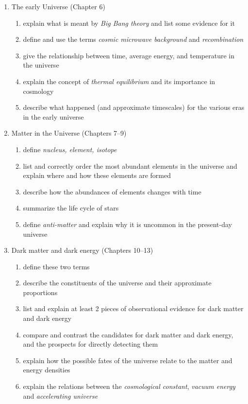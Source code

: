 \documentclass[11pt]{article}
\begin{document}
\begin{enumerate}
\item The early Universe (Chapter 6)
\begin{enumerate}
\item  explain what is meant by {\em Big Bang theory} and list some evidence for it 
\item define and use the terms {\em cosmic microwave background} and {\em recombination}
\item give the relationship between time, average energy, and temperature in the universe 
\item explain the concept of {\em thermal equilibrium} and its importance in cosmology
\item describe what happened (and approximate timescales) for the various eras in the early universe 
\end{enumerate}

\clearpage

\item Matter in the Universe (Chapters 7--9)
\begin{enumerate}
\item define {\em nucleus, element, isotope}
\item list and correctly order the most abundant elements in the universe and 
explain where and how these elements are formed
\item describe how the abundances of elements changes with time 
\item summarize the life cycle of stars
\item define {\em anti-matter} and explain why it is uncommon in the present-day universe
\end{enumerate}

\item Dark matter and dark energy (Chapters 10--13)
\begin{enumerate}
\item  define these two terms 
\item describe the constituents of the universe and their approximate proportions
\item list  and explain at least 2 pieces of observational evidence for dark matter and dark energy
\item compare and contrast the candidates for dark matter and dark energy, and the prospects for
directly detecting them
\item explain how the possible fates of the universe  relate to the matter and energy densities 
\item explain the relations between the {\em cosmological constant}, {\em vacuum energy} and {\em accelerating universe}
\end{enumerate}


\end{enumerate}
\end{document}
